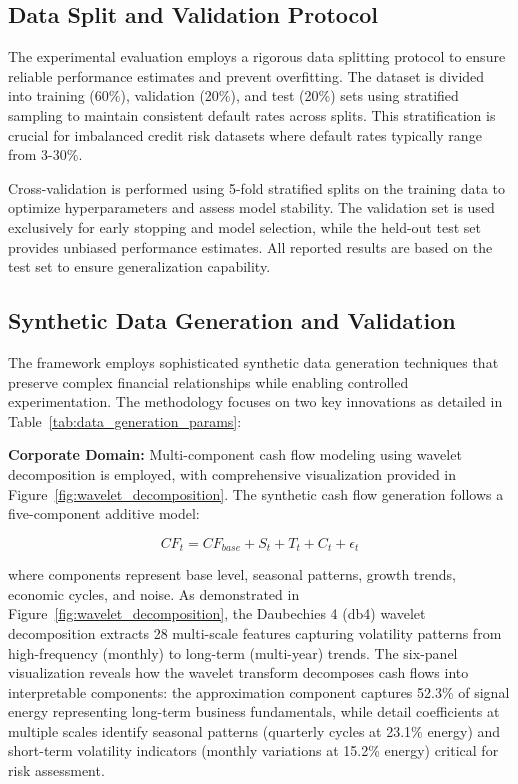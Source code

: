 \documentclass[a4paper,11pt,twoside]{article}
\newcommand{\0}{\Bf{0}}
\theoremstyle{definition}
\begin{document}
\subsection{Data Split and Validation Protocol}

The experimental evaluation employs a rigorous data splitting protocol to ensure reliable performance estimates and prevent overfitting. The dataset is divided into training (60\%), validation (20\%), and test (20\%) sets using stratified sampling to maintain consistent default rates across splits. This stratification is crucial for imbalanced credit risk datasets where default rates typically range from 3-30\%.

Cross-validation is performed using 5-fold stratified splits on the training data to optimize hyperparameters and assess model stability. The validation set is used exclusively for early stopping and model selection, while the held-out test set provides unbiased performance estimates. All reported results are based on the test set to ensure generalization capability.

\subsection{Synthetic Data Generation and Validation}

The framework employs sophisticated synthetic data generation techniques that preserve complex financial relationships while enabling controlled experimentation. The methodology focuses on two key innovations as detailed in Table~\ref{tab:data_generation_params}:

\textbf{Corporate Domain:} Multi-component cash flow modeling using wavelet decomposition is employed, with comprehensive visualization provided in Figure~\ref{fig:wavelet_decomposition}. The synthetic cash flow generation follows a five-component additive model:

\begin{equation}
CF_t = CF_{base} + S_t + T_t + C_t + \epsilon_t
\end{equation}

where components represent base level, seasonal patterns, growth trends, economic cycles, and noise. As demonstrated in Figure~\ref{fig:wavelet_decomposition}, the Daubechies 4 (db4) wavelet decomposition extracts 28 multi-scale features capturing volatility patterns from high-frequency (monthly) to long-term (multi-year) trends. The six-panel visualization reveals how the wavelet transform decomposes cash flows into interpretable components: the approximation component captures 52.3\% of signal energy representing long-term business fundamentals, while detail coefficients at multiple scales identify seasonal patterns (quarterly cycles at 23.1\% energy) and short-term volatility indicators (monthly variations at 15.2\% energy) critical for risk assessment.
\end{document}
